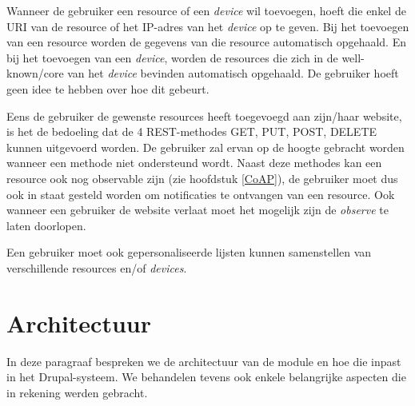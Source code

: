 Wanneer de gebruiker een resource of een \textit{device} wil toevoegen, hoeft die enkel de URI van de resource of het IP-adres van het \textit{device} op te geven. Bij het toevoegen van een resource worden de gegevens van die resource automatisch opgehaald. En bij het toevoegen van een \textit{device}, worden de resources die zich in de well-known/core van het \textit{device} bevinden automatisch opgehaald. De gebruiker hoeft geen idee te hebben over hoe dit gebeurt.

Eens de gebruiker de gewenste resources heeft toegevoegd aan zijn/haar website, is het de bedoeling dat de 4 REST-methodes GET, PUT, POST, DELETE kunnen uitgevoerd worden. De gebruiker zal ervan op de hoogte gebracht worden wanneer een methode niet ondersteund wordt. Naast deze methodes kan een resource ook nog observable zijn (zie hoofdstuk \ref{CoAP}), de gebruiker moet dus ook in staat gesteld worden om notificaties te ontvangen van een resource. Ook wanneer een gebruiker de website verlaat moet het mogelijk zijn de \textit{observe} te laten doorlopen.

Een gebruiker moet ook gepersonaliseerde lijsten kunnen samenstellen van verschillende resources en/of \textit{devices}.

\section{Architectuur}
In deze paragraaf bespreken we de architectuur van de module en hoe die inpast in het Drupal-systeem. We behandelen tevens ook enkele belangrijke aspecten die in rekening werden gebracht. %

